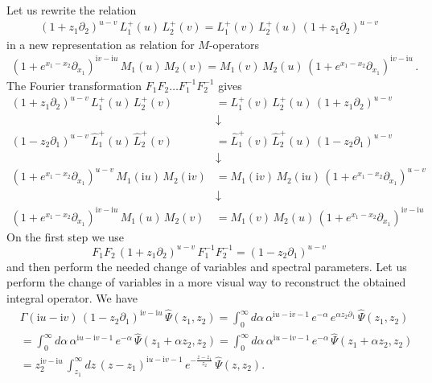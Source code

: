 \documentclass[11pt]{article}
\numberwithin{equation}{section}
\theoremstyle{plain}
\theoremstyle{definition}
\def\dd{\partial}
\renewcommand{\imath}{\mathrm{i}}
\begin{document}
Let us rewrite the relation  
\begin{align}
	(1+z_{1} \dd_{2})^{u-v} \,
	L^{+}_{1}(u) \, L^{+}_{2}(v) =
	L^{+}_{1}(v)\, L^{+}_{2}(u) \,
	(1+z_{1} \dd_{2})^{u-v}
\end{align} 
in a new representation as relation for $M$-operators
\begin{align}
	(1+e^{x_1-x_{2}}\dd_{x_1})^{\imath v-\imath u}\,M_{1}(u)\,M_{2}(v) = M_{1}(v)\,M_{2}(u) 
	\,(1+e^{x_1-x_{2}}\dd_{x_1})^{\imath v-\imath u}\,.
\end{align}
The Fourier transformation $F_1 F_2 \ldots F^{-1}_1 F^{-1}_2$ 
gives 
\begin{align*}
	(1+z_{1} \dd_{2})^{u-v} \,
	L^{+}_{1}(u) \, L^{+}_{2}(v) &=
	L^{+}_{1}(v)\, L^{+}_{2}(u) \,
	(1+z_{1} \dd_{2})^{u-v}  \\ 
	&\downarrow\\  (1-z_{2} \dd_{1})^{u-v} \,
	\hat{L}^{+}_{1}(u) \, \hat{L}^{+}_{2}(v) &=
	\hat{L}^{+}_{1}(v)\, \hat{L}^{+}_{2}(u) \,
	(1-z_{2} \dd_{1})^{u-v} \\ 
	&\downarrow \\ (1+e^{x_1-x_{2}}\dd_{x_1})^{u-v} \,
	M_{1}(\imath u) \, M_{2}(\imath v) &=
	M_{1}(\imath v)\, M_{2}(\imath u) \,
	(1+e^{x_1-x_{2}}\dd_{x_1})^{u-v} \\ 
	&\downarrow \\ 
	(1+e^{x_1-x_{2}}\dd_{x_1})^{\imath v-\imath u} \,
	M_{1}(u) \, M_{2}(v) &=
	M_{1}(v)\, M_{2}(u) \,
	(1+e^{x_1-x_{2}}\dd_{x_1})^{\imath v-\imath u}
\end{align*}
On the first step we use 
$$
F_1 F_2\,(1+z_{1} \dd_{2})^{u-v}\, F^{-1}_1 F^{-1}_2 = 
(1-z_{2} \dd_{1})^{u-v}
$$
and then perform the needed change of variables and spectral parameters.
Let us perform the change of variables in a more visual way to reconstruct the obtained integral operator. We have  
\begin{align*}
	&\Gamma(\imath u-\imath v)\,(1-z_{2} \dd_{1})^{\imath v-\imath u}\,\hat{\Psi}(z_1 , z_2) = 
	\int_{0}^{\infty} d\alpha\,\alpha^{\imath u-\imath v-1} 
	\,e^{-\alpha}\,e^{\alpha z_2\partial_1}
	\,\hat{\Psi}(z_1 , z_2) \\ 
	& =
	\int_{0}^{\infty} d\alpha\,\alpha^{\imath u-\imath v-1} 
	\,e^{-\alpha}\,\hat{\Psi}(z_1 +\alpha z_2, z_2) = 
	\int_{0}^{\infty} d\alpha\,\alpha^{\imath u-\imath v-1} 
	\,e^{-\alpha}\,\hat{\Psi}(z_1 +\alpha z_2, z_2) \\ 
	& = z_2^{\imath v-\imath u}\,
	\int_{z_1}^{\infty} d z\,(z-z_1)^{\imath u-\imath v-1} 
	\,e^{-\frac{z-z_1}{z_2}}\,\hat{\Psi}(z, z_2).
\end{align*}
\end{document}

